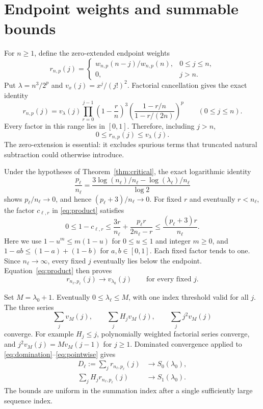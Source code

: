\documentclass[11pt]{article}
\begin{document}
\section{Endpoint weights and summable bounds}
For $n\ge1$, define the zero-extended endpoint weights
\[
r_{n,p}(j)=
\begin{cases}
w_{n,p}(n-j)/w_{n,p}(n),&0\le j\le n,\\
0,&j>n.
\end{cases}
\]
Put $\lambda=n^3/2^p$ and $v_x(j)=x^j/(j!)^2$. Factorial cancellation gives the exact identity
\begin{equation}
r_{n,p}(j)=v_\lambda(j)\prod_{r=0}^{j-1}
\left(1-\frac rn\right)^3
\left(\frac{1-r/n}{1-r/(2n)}\right)^p
\qquad(0\le j\le n).
\label{eq:product}
\end{equation}
Every factor in this range lies in $[0,1]$. Therefore, including $j>n$,
\begin{equation}
0\le r_{n,p}(j)\le v_\lambda(j).
\label{eq:domination}
\end{equation}
The zero-extension is essential: it excludes spurious terms that truncated natural subtraction could otherwise introduce.

Under the hypotheses of Theorem~\ref{thm:critical}, the exact logarithmic identity
\[
\frac{p_\ell}{n_\ell}=
\frac{3\log(n_\ell)/n_\ell-\log(\lambda_\ell)/n_\ell}{\log2}
\]
shows $p_\ell/n_\ell\to0$, and hence $(p_\ell+3)/n_\ell\to0$.
For fixed $r$ and eventually $r<n_\ell$, the factor $c_{\ell,r}$ in \eqref{eq:product} satisfies
\[
0\le1-c_{\ell,r}\le\frac{3r}{n_\ell}
+\frac{p_\ell r}{2n_\ell-r}
\le\frac{(p_\ell+3)r}{n_\ell}.
\]
Here we use $1-u^m\le m(1-u)$ for $0\le u\le1$ and integer $m\ge0$, and $1-ab\le(1-a)+(1-b)$ for $a,b\in[0,1]$. Each fixed factor tends to one. Since $n_\ell\to\infty$, every fixed $j$ eventually lies below the endpoint. Equation~\eqref{eq:product} then proves
\begin{equation}
r_{n_\ell,p_\ell}(j)\longrightarrow v_{\lambda_0}(j)
\qquad\text{for every fixed }j.
\label{eq:pointwise}
\end{equation}

Set $M=\lambda_0+1$. Eventually $0\le\lambda_\ell\le M$, with one index threshold valid for all $j$. The three series
\[
\sum_jv_M(j),\qquad \sum_jH_jv_M(j),\qquad \sum_j j^2v_M(j)
\]
converge. For example $H_j\le j$, polynomially weighted factorial series converge, and $j^2v_M(j)=M v_M(j-1)$ for $j\ge1$. Dominated convergence applied to \eqref{eq:domination}--\eqref{eq:pointwise} gives
\begin{align}
D_\ell:=\sum_jr_{n_\ell,p_\ell}(j)&\longrightarrow S_0(\lambda_0),\label{eq:D}\\
\sum_jH_jr_{n_\ell,p_\ell}(j)&\longrightarrow S_1(\lambda_0).\label{eq:H}
\end{align}
The bounds are uniform in the summation index after a single sufficiently large sequence index.
\end{document}
